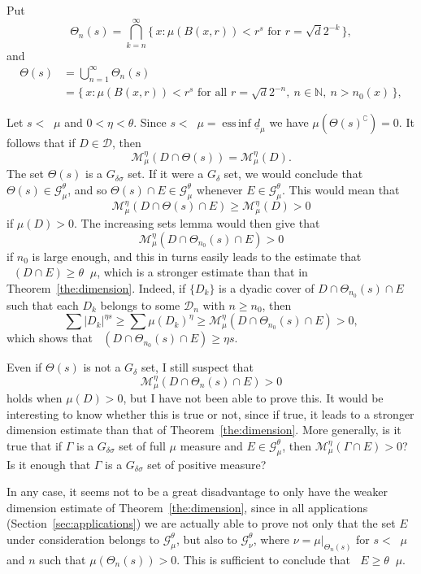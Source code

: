 \documentclass[AHL,Unicode,longabstracts]{cedram}
\DeclareMathOperator{\dimh}{dim_H}
\DeclareMathOperator{\ldimh}{\underline{dim}_H}
\DeclareMathOperator{\udimh}{\overline{dim}_H}
\DeclareMathOperator*{\essinf}{ess\,inf}
\newcommand*{\dimh}{\mathrm{dim}_{\mathrm{H}}}
\begin{document}
\begin{rema}\label{rem:dimension}
Put
\[
\Theta_n (s) = \bigcap_{k=n}^\infty \{\, x : \mu (B (x,r)) < r^s
\text{ for } r = \sqrt{d} 2^{-k} \,\},
\]
and
\begin{align*}
\Theta (s) &= \bigcup_{n=1}^\infty \Theta_n (s)
\\ &= \{\, x : \mu (B (x,r)) < r^s \text{ for all } r = \sqrt{d} 2^{-n},\ n \in \mathbb{N},\ n> n_0 (x) \,\},
\end{align*}

Let $s < \ldimh \mu$ and $0 < \eta < \theta$. Since $s < \ldimh \mu = \essinf \underline{d}_\mu$ we have $\mu (\Theta(s)^\complement) = 0$. It follows that if $D \in \mathscr{D}$, then
\[
\mathscr{M}_\mu^\eta (D \cap \Theta (s)) =
\mathscr{M}_\mu^\eta (D).
\]
The set $\Theta (s)$ is a $G_{\delta \sigma}$ set. If it were a $G_\delta$ set, we would conclude that $\Theta (s) \in
\mathscr{G}_\mu^\theta$, and so $\Theta (s) \cap E \in
\mathscr{G}_\mu^\theta$ whenever $E \in
\mathscr{G}_\mu^\theta$. This would mean that
\[
\mathscr{M}_\mu^\eta (D \cap \Theta (s) \cap E) \geq
\mathscr{M}_\mu^\eta (D) > 0
\]
if $\mu (D) > 0$. The increasing sets lemma would then give that
\[
\mathscr{M}_\mu^\eta (D \cap \Theta_{n_0} (s) \cap E) > 0
\]
if $n_0$ is large enough, and this in turns easily leads to the estimate that $\dimh (D \cap E) \geq \theta \ldimh \mu$, which is a stronger estimate than that in Theorem~\ref{the:dimension}. Indeed, if $\{D_k\}$ is a dyadic cover of $D \cap \Theta_{n_0} (s) \cap E$ such that each $D_k$ belongs to some $\mathscr{D}_n$ with $n \geq n_0$, then
\[
\sum |D_k|^{\eta s} \geq \sum \mu (D_k)^\eta \geq
\mathscr{M}_\mu^\eta (D \cap \Theta_{n_0} (s) \cap E) > 0,
\]
which shows that $\dimh (D \cap \Theta_{n_0} (s) \cap E) \geq \eta s$.

Even if $\Theta (s)$ is not a $G_\delta$ set, I still suspect that
\[
\mathscr{M}_\mu^\eta (D \cap \Theta_n (s) \cap E) > 0
\]
holds when $\mu (D) > 0$, but I have not been able to prove this. It would be interesting to know whether this is true or not, since if true, it leads to a stronger dimension estimate than that of Theorem~\ref{the:dimension}. More generally, is it true that if $\Gamma$ is a $G_{\delta \sigma}$ set of full $\mu$ measure and $E
\in \mathscr{G}_\mu^\theta$, then $\mathscr{M}_\mu^\eta (\Gamma \cap E) > 0$? Is it enough that $\Gamma$ is a $G_{\delta \sigma}$ set of positive measure?

In any case, it seems not to be a great disadvantage to only have the weaker dimension estimate of Theorem~\ref{the:dimension}, since in all applications (Section~\ref{sec:applications}) we are actually able to prove not only that the set $E$ under consideration belongs to $\mathscr{G}_\mu^\theta$, but also to $\mathscr{G}_\nu^\theta$, where $\nu = \mu |_{\Theta_n (s)}$ for $s < \udimh \mu$ and $n$ such that $\mu (\Theta_n (s)) > 0$. This is sufficient to conclude that $\dimh E \geq \theta \udimh \mu$.
\end{rema}
\end{document}

